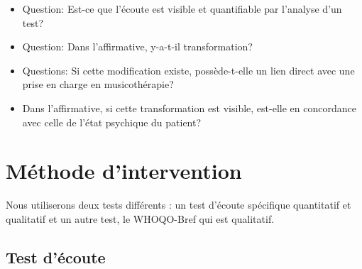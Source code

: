 
 \begin{itemize}
 \item  Question:
   Est-ce que l'écoute est visible et quantifiable par
          l'analyse d'un test?
 
 \end{itemize}
 	
 \begin{itemize}
 \item Question:
   Dans l'affirmative, y-a-t-il transformation?
   
\end{itemize}
 
\begin{itemize}
          
 \item Questions:
   Si cette modification existe, possède-t-elle un lien direct avec une prise en charge
  en musicothérapie?
  
  \item Dans l'affirmative, 
   si cette transformation est visible, est-elle en 
 	concordance 
 	avec celle de l'état psychique du patient?
        
 \end{itemize}

 






 

\section{Méthode d'intervention}

	Nous utiliserons deux tests différents : 
	un test d'écoute spécifique quantitatif et qualitatif 
	et un autre test, le WHOQO-Bref qui est qualitatif.

		
        \subsection{Test d'écoute}
        
